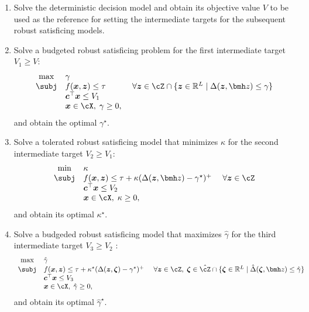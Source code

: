 \documentclass[opre, blindrev]{informs4}
\newcommand{\1}[1]{\mathds{1}{\left(#1\right)}}
\begin{document}
\begin{enumerate}[Step 1.]\addtocounter{enumi}{-1}
\item Solve the deterministic decision model and obtain its objective value $V$ to be used as the reference for setting the intermediate targets for the subsequent robust satisficing models.

\item Solve a budgeted robust satisficing problem for the first intermediate target $V_{1}\geq V$:
\[
\begin{array}{cll}
\max & \gamma  \\
\subj & f(\bm x,\bm z) \leq \tau &~\forall \bm z \in \cZ \cap \{\bm z \in \mathbb{R}^L \;|\; \Delta(\bm z,\bmh z) \leq \gamma\} \\
& \bm c^\top \bm x \leq V_{1} \\
& \bm x \in \cX, \; \gamma \geq 0,
\end{array}
\]
and obtain the optimal $\gamma^\star$. 

\item Solve a tolerated robust satisficing model that minimizes $\kappa$ for the second intermediate target $V_{2} \geq V_{1}$: 
\[
\begin{array}{cll} 
\min & \kappa   \\
{\subj} & f(\bm x,\bm z) \leq \tau +  \kappa (\Delta(\bm z,\bmh z) - \gamma^\star)^+ &~\forall \bm z \in \cZ \\
& \bm c^\top \bm x \leq V_{2} \\
& \bm x \in \cX, \; \kappa \geq 0,
\end{array}
\]
and obtain its optimal $\kappa^\star$.

\item Solve a budgeded robust satisficing model that maximizes $\hat \gamma$ for the third intermediate target $V_{3}\geq V_{2}$ : 
\[
\begin{array}{cll} 
\max & \hat \gamma \\
{\subj} & f(\bm x,\bm z) \leq \tau +  \kappa^\star (\Delta(\bm z,\bm \zeta) - \gamma^\star)^+ &~\forall \bm z \in \cZ, \; \bm \zeta \in \hat \cZ \cap \{\bm \zeta \in \mathbb{R}^L \;|\; \hat \Delta(\bm \zeta,\bmh z) \leq \hat \gamma \} \\
& \bm c^\top \bm x \leq V_{3} \\
& \bm x \in  \cX, \; \hat \gamma \geq 0,
\end{array}
\]
and obtain its optimal $\hat \gamma^\star$. 


\end{enumerate}
\end{document}
